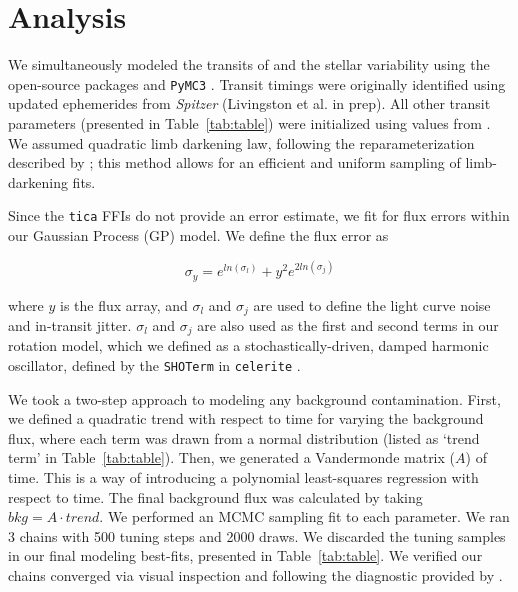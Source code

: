 \documentclass[twocolumn]{aastex631}
\begin{document}
\section{Analysis} \label{sec:analysis}

We simultaneously modeled the transits of \allplanets and the stellar variability using the open-source packages \exoplanet \citep{exoplanet2019, exoplanet2021} and \texttt{PyMC3} \citep{Salvatier16}. Transit timings were originally identified using updated ephemerides from \textit{Spitzer} (Livingston et al. in prep). All other transit parameters (presented in Table~\ref{tab:table}) were initialized using values from \cite{David2019a}. We assumed quadratic limb darkening law, following the reparameterization described by \cite{kipping13}; this method allows for an efficient and uniform sampling of limb-darkening fits.


Since the \texttt{tica} FFIs do not provide an error estimate, we fit for flux errors within our Gaussian Process (GP) model. We define the flux error as

\begin{equation}
    \sigma_y = e^{ln(\sigma_l)} + y^2 e^{2 ln(\sigma_j)}
\end{equation}

where $y$ is the flux array, and $\sigma_l$  and $\sigma_j$ are used to define the light curve noise and in-transit jitter. $\sigma_l$  and $\sigma_j$ are also used as the first and second terms in our rotation model, which we defined as a stochastically-driven, damped harmonic oscillator, defined by the \texttt{SHOTerm} in \texttt{celerite} \citep{dfm17}.

We took a two-step approach to modeling any background contamination. First, we defined a quadratic trend with respect to time for varying the background flux, where each term was drawn from a normal distribution (listed as `trend term' in Table~\ref{tab:table}). Then, we generated a Vandermonde matrix ($A$) of time. This is a way of introducing a polynomial least-squares regression with respect to time. The final background flux was calculated by taking $bkg = A \cdot trend$.  
We performed an MCMC sampling fit to each parameter. We ran 3 chains with 500 tuning steps and 2000 draws. We discarded the tuning samples in our final modeling best-fits, presented in Table~\ref{tab:table}. We verified our chains converged via visual inspection and following the diagnostic provided by \cite{Geweke92}.
\end{document}
